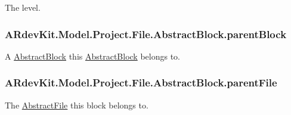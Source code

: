 The level. \hypertarget{class_a_rdev_kit_1_1_model_1_1_project_1_1_file_1_1_abstract_block_aaa3372dadcd8d2b6ff2356ec984551c9}{
\subsubsection[{parent\-Block}]{ A\-Rdev\-Kit.\-Model.\-Project.\-File.\-Abstract\-Block.\-parent\-Block\hspace{0.3cm}{\ttfamily [protected]}}}\label{class_a_rdev_kit_1_1_model_1_1_project_1_1_file_1_1_abstract_block_aaa3372dadcd8d2b6ff2356ec984551c9}


A \hyperlink{class_a_rdev_kit_1_1_model_1_1_project_1_1_file_1_1_abstract_block}{Abstract\-Block} this \hyperlink{class_a_rdev_kit_1_1_model_1_1_project_1_1_file_1_1_abstract_block}{Abstract\-Block} belongs to. 

\hypertarget{class_a_rdev_kit_1_1_model_1_1_project_1_1_file_1_1_abstract_block_a7dd07d5a865359c764a8cdab272a0662}{
\subsubsection[{parent\-File}]{ A\-Rdev\-Kit.\-Model.\-Project.\-File.\-Abstract\-Block.\-parent\-File\hspace{0.3cm}{\ttfamily [protected]}}}\label{class_a_rdev_kit_1_1_model_1_1_project_1_1_file_1_1_abstract_block_a7dd07d5a865359c764a8cdab272a0662}


The \hyperlink{class_a_rdev_kit_1_1_model_1_1_project_1_1_file_1_1_abstract_file}{Abstract\-File} this block belongs to. 



